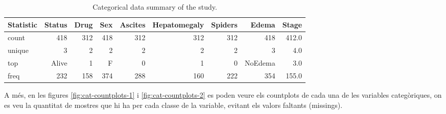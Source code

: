 \begin{table}[H]
\centering
\begin{tabular}{lrrrrrrrr}
\hline
\textbf{Statistic} & \textbf{Status} & \textbf{Drug} & \textbf{Sex} & \textbf{Ascites} & \textbf{Hepatomegaly} & \textbf{Spiders} & \textbf{Edema} & \textbf{Stage} \\ 
\hline
count & 418 & 312 & 418 & 312 & 312 & 312 & 418 & 412.0 \\ 
unique & 3 & 2 & 2 & 2 & 2 & 2 & 3 & 4.0 \\ 
top & Alive & 1 & F & 0 & 1 & 0 & NoEdema & 3.0 \\ 
freq & 232 & 158 & 374 & 288 & 160 & 222 & 354 & 155.0 \\ 
\hline
\end{tabular}
\caption{Categorical data summary of the study.}
\label{tab:cat-stats-1}
\end{table}

A més, en les figures \ref{fig:cat-countplots-1} i \ref{fig:cat-countplots-2} es poden veure els countplots de cada una de les variables categòriques, on es veu la quantitat de mostres que hi ha per cada classe de la variable, evitant els valors faltants (missings).

